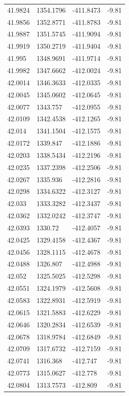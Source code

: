 \begin{table}[H]
\begin{tabular}{llll}
41.9824 & 1354.1796 & -411.8473 & -9.81 \\
41.9856 & 1352.8771 & -411.8783 & -9.81 \\
41.9887 & 1351.5745 & -411.9094 & -9.81 \\
41.9919 & 1350.2719 & -411.9404 & -9.81 \\
41.995 & 1348.9691 & -411.9714 & -9.81 \\
41.9982 & 1347.6662 & -412.0024 & -9.81 \\
42.0014 & 1346.3633 & -412.0335 & -9.81 \\
42.0045 & 1345.0602 & -412.0645 & -9.81 \\
42.0077 & 1343.757 & -412.0955 & -9.81 \\
42.0109 & 1342.4538 & -412.1265 & -9.81 \\
42.014 & 1341.1504 & -412.1575 & -9.81 \\
42.0172 & 1339.847 & -412.1886 & -9.81 \\
42.0203 & 1338.5434 & -412.2196 & -9.81 \\
42.0235 & 1337.2398 & -412.2506 & -9.81 \\
42.0267 & 1335.936 & -412.2816 & -9.81 \\
42.0298 & 1334.6322 & -412.3127 & -9.81 \\
42.033 & 1333.3282 & -412.3437 & -9.81 \\
42.0362 & 1332.0242 & -412.3747 & -9.81 \\
42.0393 & 1330.72 & -412.4057 & -9.81 \\
42.0425 & 1329.4158 & -412.4367 & -9.81 \\
42.0456 & 1328.1115 & -412.4678 & -9.81 \\
42.0488 & 1326.807 & -412.4988 & -9.81 \\
42.052 & 1325.5025 & -412.5298 & -9.81 \\
42.0551 & 1324.1979 & -412.5608 & -9.81 \\
42.0583 & 1322.8931 & -412.5919 & -9.81 \\
42.0615 & 1321.5883 & -412.6229 & -9.81 \\
42.0646 & 1320.2834 & -412.6539 & -9.81 \\
42.0678 & 1318.9784 & -412.6849 & -9.81 \\
42.0709 & 1317.6732 & -412.7159 & -9.81 \\
42.0741 & 1316.368 & -412.747 & -9.81 \\
42.0773 & 1315.0627 & -412.778 & -9.81 \\
42.0804 & 1313.7573 & -412.809 & -9.81 \\

\end{tabular}
\end{table}
